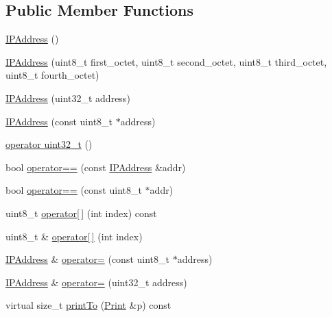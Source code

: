 \subsection*{Public Member Functions}
\begin{DoxyCompactItemize}
\item 
\hyperlink{class_i_p_address_a6089825af3b03060f80282d0dcca1582}{I\-P\-Address} ()
\item 
\hyperlink{class_i_p_address_af25acf9a16981a1b95c66e9e683245b0}{I\-P\-Address} (uint8\-\_\-t first\-\_\-octet, uint8\-\_\-t second\-\_\-octet, uint8\-\_\-t third\-\_\-octet, uint8\-\_\-t fourth\-\_\-octet)
\item 
\hyperlink{class_i_p_address_a9acd9971a8fc47fa51681e9b9a95b511}{I\-P\-Address} (uint32\-\_\-t address)
\item 
\hyperlink{class_i_p_address_ab747742c0a428a369f6ab73b7d28c306}{I\-P\-Address} (const uint8\-\_\-t $\ast$address)
\item 
\hyperlink{class_i_p_address_a90aebdb7f5f655fe3a5e3d8aa3bc3ac8}{operator uint32\-\_\-t} ()
\item 
bool \hyperlink{class_i_p_address_adc404569f7c8193c1be9d79a27753099}{operator==} (const \hyperlink{class_i_p_address}{I\-P\-Address} \&addr)
\item 
bool \hyperlink{class_i_p_address_af685847e3b72825b9c9f0ed5b828683f}{operator==} (const uint8\-\_\-t $\ast$addr)
\item 
uint8\-\_\-t \hyperlink{class_i_p_address_ac1e9d3628dc5bc5151324c80a69ad159}{operator\mbox{[}$\,$\mbox{]}} (int index) const 
\item 
uint8\-\_\-t \& \hyperlink{class_i_p_address_ab7c569a71648e9235ebb63d7a6d58143}{operator\mbox{[}$\,$\mbox{]}} (int index)
\item 
\hyperlink{class_i_p_address}{I\-P\-Address} \& \hyperlink{class_i_p_address_a0dc5d0937fec535ef61daa5d05f30d3a}{operator=} (const uint8\-\_\-t $\ast$address)
\item 
\hyperlink{class_i_p_address}{I\-P\-Address} \& \hyperlink{class_i_p_address_af80a0f81dc5861ae3240a4331c5fc14c}{operator=} (uint32\-\_\-t address)
\item 
virtual size\-\_\-t \hyperlink{class_i_p_address_a2dd7f6c455c2f33e4639944f751930db}{print\-To} (\hyperlink{class_print}{Print} \&p) const 
\end{DoxyCompactItemize}
